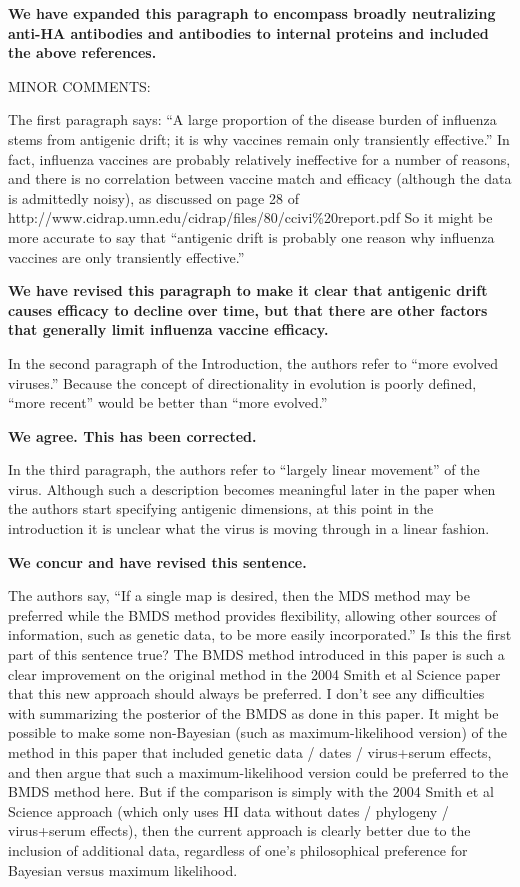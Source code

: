 \documentclass[11pt,oneside,letterpaper]{article}
\begin{document}
\textbf{We have expanded this paragraph to encompass broadly neutralizing anti-HA antibodies and antibodies to internal proteins and included the above references.}

MINOR COMMENTS: 

The first paragraph says: ``A large proportion of the disease burden of influenza stems from antigenic drift; it is why vaccines remain only transiently effective.'' In fact, influenza vaccines are probably relatively ineffective for a number of reasons, and there is no correlation between vaccine match and efficacy (although the data is admittedly noisy), as discussed on page 28 of http://www.cidrap.umn.edu/cidrap/files/80/ccivi\%20report.pdf So it might be more accurate to say that ``antigenic drift is probably one reason why influenza vaccines are only transiently effective.''

\textbf{We have revised this paragraph to make it clear that antigenic drift causes efficacy to decline over time, but that there are other factors that generally limit influenza vaccine efficacy.}

In the second paragraph of the Introduction, the authors refer to ``more evolved viruses.'' Because the concept of directionality in evolution is poorly defined, ``more recent'' would be better than ``more evolved.''

\textbf{We agree. This has been corrected.}

In the third paragraph, the authors refer to ``largely linear movement'' of the virus. Although such a description becomes meaningful later in the paper when the authors start specifying antigenic dimensions, at this point in the introduction it is unclear what the virus is moving through in a linear fashion.

\textbf{We concur and have revised this sentence.}

The authors say, ``If a single map is desired, then the MDS method may be preferred while the BMDS method provides flexibility, allowing other sources of information, such as genetic data, to be more easily incorporated.'' Is this the first part of this sentence true? The BMDS method introduced in this paper is such a clear improvement on the original method in the 2004 Smith et al Science paper that this new approach should always be preferred. I don't see any difficulties with summarizing the posterior of the BMDS as done in this paper. It might be possible to make some non-Bayesian (such as maximum-likelihood version) of the method in this paper that included genetic data / dates / virus+serum effects, and then argue that such a maximum-likelihood version could be preferred to the BMDS method here. But if the comparison is simply with the 2004 Smith et al Science approach (which only uses HI data without dates / phylogeny / virus+serum effects), then the current approach is clearly better due to the inclusion of additional data, regardless of one's philosophical preference for Bayesian versus maximum likelihood.
\end{document}

